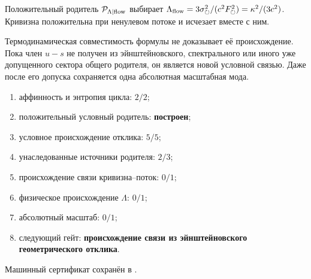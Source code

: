 \begin{theorem}
Положительный родитель $\mathcal P_{\Lambda\mid\rm flow}$ выбирает
$\Lambda_{\rm flow}=3\sigma_\circlearrowright^2/
(c^2F_\circlearrowright^2)=\kappa^2/(3c^2)$. Кривизна положительна при
ненулевом потоке и исчезает вместе с ним.
\end{theorem}

\begin{nogocriterion}
Термодинамическая совместимость формулы не доказывает её происхождение.
Пока член $u-s$ не получен из эйнштейновского, спектрального или иного уже
допущенного сектора общего родителя, он является новой условной связью.
Даже после его допуска сохраняется одна абсолютная масштабная мода.
\end{nogocriterion}

\begin{protocol}\begin{enumerate}
\item аффинность и энтропия цикла: \textbf{$2/2$};
\item положительный условный родитель: \textbf{построен};
\item условное происхождение отклика: \textbf{$5/5$};
\item унаследованные источники родителя: \textbf{$2/3$};
\item происхождение связи кривизна--поток: \textbf{$0/1$};
\item физическое происхождение $\Lambda$: \textbf{$0/1$};
\item абсолютный масштаб: \textbf{$0/1$};
\item следующий гейт: \textbf{происхождение связи из эйнштейновского
геометрического отклика}.
\end{enumerate}\end{protocol}

Машинный сертификат сохранён в
.